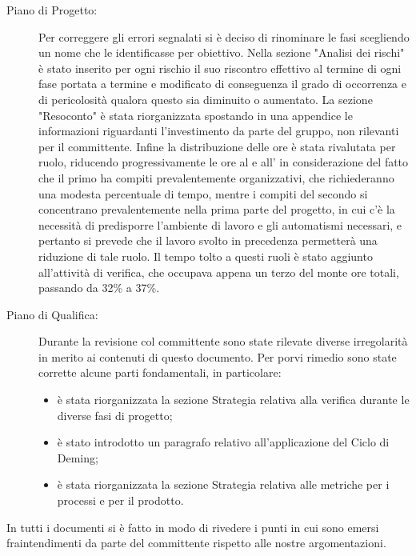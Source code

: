 \begin{description}
\item[Piano di Progetto:] Per correggere gli errori segnalati si è deciso di rinominare le fasi scegliendo un nome che le identificasse per obiettivo. Nella sezione "Analisi dei rischi" è stato inserito per ogni rischio il suo riscontro effettivo al termine di ogni fase portata a termine e modificato di conseguenza il grado di occorrenza e di pericolosità qualora questo sia diminuito o aumentato. La sezione "Resoconto" è stata riorganizzata spostando in una appendice le informazioni riguardanti l'investimento da parte del gruppo, non rilevanti per il committente. Infine la distribuzione delle ore è stata rivalutata per ruolo, riducendo progressivamente le ore al  e all' in considerazione del fatto che il primo ha compiti prevalentemente organizzativi, che richiederanno una modesta percentuale di tempo, mentre i compiti del secondo si concentrano prevalentemente nella prima parte del progetto, in cui c'è la necessità di predisporre l'ambiente di lavoro e gli automatismi necessari, e pertanto si prevede che il lavoro svolto in precedenza permetterà una riduzione di tale ruolo. Il tempo tolto a questi ruoli è stato aggiunto all'attività di verifica, che occupava appena un terzo del monte ore totali, passando da 32\% a 37\%.
\item[Piano di Qualifica:] Durante la revisione col committente sono state rilevate diverse irregolarità in merito ai contenuti di questo documento. Per porvi rimedio sono state corrette alcune parti fondamentali, in particolare:
\begin{itemize}
\item è stata riorganizzata la sezione Strategia relativa alla verifica durante le diverse fasi di progetto;
\item è stato introdotto un paragrafo relativo all'applicazione del Ciclo di Deming;
\item è stata riorganizzata la sezione Strategia relativa alle metriche per i processi e per il prodotto.
\end{itemize}
\end{description}
In tutti i documenti si è fatto in modo di rivedere i punti in cui sono emersi fraintendimenti da parte del committente rispetto alle nostre argomentazioni.
